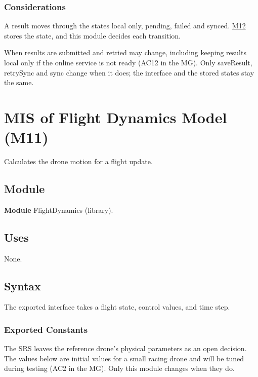 \documentclass[12pt, titlepage]{article}
\newcommand{\Mref}[1]{\hyperref[sec:M#1]{M#1}}
\begin{document}
\subsubsection{Considerations}

A result moves through the states local only, pending, failed and synced.
\Mref{12} stores the state, and this module decides each transition.

When results are submitted and retried may change, including keeping results
local only if the online service is not ready (AC12 in the MG). Only saveResult,
retrySync and sync change when it does; the interface and the stored states
stay the same.

\newpage
\section{MIS of Flight Dynamics Model (M11)} \label{sec:M11}

Calculates the drone motion for a flight update.

\subsection{Module}

\textbf{Module} FlightDynamics (library).

\subsection{Uses}

None.

\subsection{Syntax}

The exported interface takes a flight state, control values, and time step.

\subsubsection{Exported Constants}

The SRS leaves the reference drone's physical parameters as an open decision.
The values below are initial values for a small racing drone and will be tuned
during testing (AC2 in the MG). Only this module changes when they do.
\end{document}
